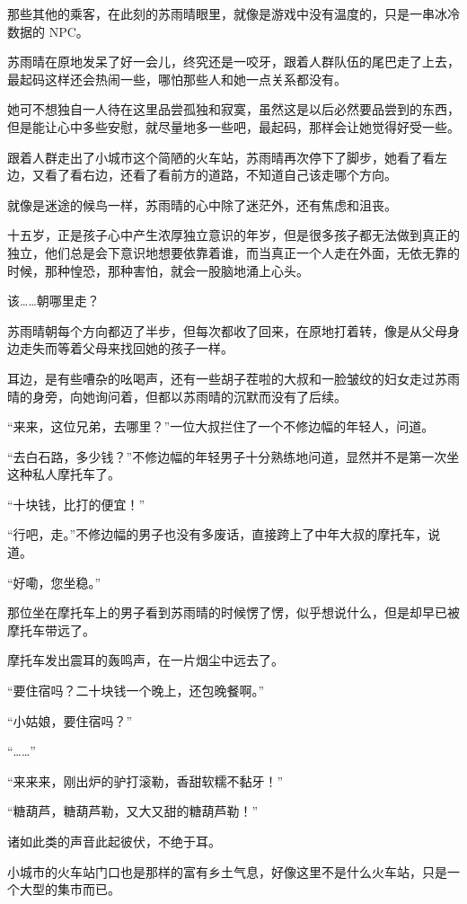 那些其他的乘客，在此刻的苏雨晴眼里，就像是游戏中没有温度的，只是一串冰冷数据的 NPC。

苏雨晴在原地发呆了好一会儿，终究还是一咬牙，跟着人群队伍的尾巴走了上去，最起码这样还会热闹一些，哪怕那些人和她一点关系都没有。

她可不想独自一人待在这里品尝孤独和寂寞，虽然这是以后必然要品尝到的东西，但是能让心中多些安慰，就尽量地多一些吧，最起码，那样会让她觉得好受一些。

跟着人群走出了小城市这个简陋的火车站，苏雨晴再次停下了脚步，她看了看左边，又看了看右边，还看了看前方的道路，不知道自己该走哪个方向。

就像是迷途的候鸟一样，苏雨晴的心中除了迷茫外，还有焦虑和沮丧。

十五岁，正是孩子心中产生浓厚独立意识的年岁，但是很多孩子都无法做到真正的独立，他们总是会下意识地想要依靠着谁，而当真正一个人走在外面，无依无靠的时候，那种惶恐，那种害怕，就会一股脑地涌上心头。

该……朝哪里走？

苏雨晴朝每个方向都迈了半步，但每次都收了回来，在原地打着转，像是从父母身边走失而等着父母来找回她的孩子一样。

耳边，是有些嘈杂的吆喝声，还有一些胡子茬啦的大叔和一脸皱纹的妇女走过苏雨晴的身旁，向她询问着，但都以苏雨晴的沉默而没有了后续。

“来来，这位兄弟，去哪里？”一位大叔拦住了一个不修边幅的年轻人，问道。

“去白石路，多少钱？”不修边幅的年轻男子十分熟练地问道，显然并不是第一次坐这种私人摩托车了。

“十块钱，比打的便宜！”

“行吧，走。”不修边幅的男子也没有多废话，直接跨上了中年大叔的摩托车，说道。

“好嘞，您坐稳。”

那位坐在摩托车上的男子看到苏雨晴的时候愣了愣，似乎想说什么，但是却早已被摩托车带远了。

摩托车发出震耳的轰鸣声，在一片烟尘中远去了。

“要住宿吗？二十块钱一个晚上，还包晚餐啊。”

“小姑娘，要住宿吗？”

“……”

“来来来，刚出炉的驴打滚勒，香甜软糯不黏牙！”

“糖葫芦，糖葫芦勒，又大又甜的糖葫芦勒！”

诸如此类的声音此起彼伏，不绝于耳。

小城市的火车站门口也是那样的富有乡土气息，好像这里不是什么火车站，只是一个大型的集市而已。

